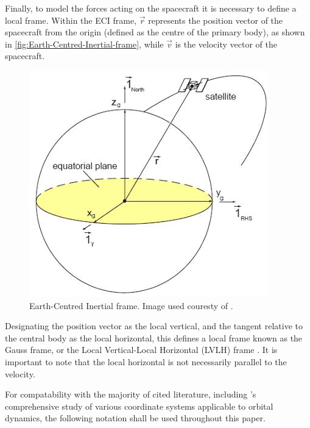 Finally, to model the forces acting on the spacecraft it is necessary to define a local frame. Within the ECI frame, $\vec{r}$ represents the position vector of the spacecraft from the origin (defined as the centre of the primary body), as shown in \autoref{fig:Earth-Centred-Inertial-frame}, while $\vec{v}$ is the velocity vector of the spacecraft.
\begin{figure}[h]
\begin{center}
\includegraphics[scale=0.75]{Images/ECI-frame.JPG}
\end{center}
\caption{Earth-Centred Inertial frame. Image used couresty of \textcite{Keppeler_thesis}.}
\label{fig:Earth-Centred-Inertial-frame}
\end{figure}
Designating the position vector as the local vertical, and the tangent relative to the central body as the local horizontal, this defines a local frame known as the Gauss frame, or the Local Vertical-Local Horizontal (LVLH) frame \parencite{STK}. It is important to note that the local horizontal is not necessarily parallel to the velocity.
 
For compatability with the majority of cited literature, including \textcite{Keppeler_thesis}'s comprehensive study of various coordinate systems applicable to orbital dynamics, the following notation shall be used throughout this paper.
 
